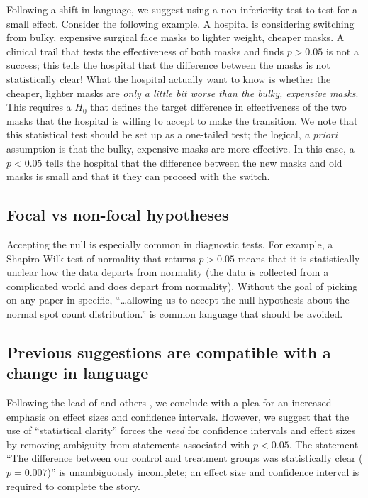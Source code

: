 Following a shift in language, we suggest using a non-inferiority test to test for a small effect. Consider the following example. A hospital is considering switching from bulky, expensive surgical face masks to lighter weight, cheaper masks. A clinical trail that tests the effectiveness of both masks and finds $p > 0.05$ is not a success; this tells the hospital that the difference between the masks is not statistically clear! What the hospital actually want to know is whether the cheaper, lighter masks are \emph{only a little bit worse than the bulky, expensive masks}. This requires a $H_{0}$ that defines the target difference in effectiveness of the two masks that the hospital is willing to accept to make the transition. We note that this statistical test should be set up as a one-tailed test; the logical, \emph{a priori} assumption is that the bulky, expensive masks are more effective. In this case, a $p < 0.05$ tells the hospital that the difference between the new masks and old masks is small and that it they can proceed with the switch.

\subsection*{Focal vs non-focal hypotheses}

Accepting the null is especially common in diagnostic tests. For example, a Shapiro-Wilk test of normality that returns $p > 0.05$ means that it is statistically unclear how the data departs from normality (the data is collected from a complicated world and does depart from normality). Without the goal of picking on any paper in specific, ``\ldots allowing us to accept the null hypothesis about the normal spot count distribution.'' \citep{Karulinetal.2015} is common language that should be avoided.

\subsection*{Previous suggestions are compatible with a change in language}

Following the lead of \citet{Cohen1994} and others \citep{Goodman1999, ZiliakandMcCloskey2008, WassersteinandLazar2016}, we conclude with a plea for an increased emphasis on effect sizes and confidence intervals. However, we suggest that the use of ``statistical clarity'' forces the \emph{need} for confidence intervals and effect sizes by removing ambiguity from statements associated with $p < 0.05$. The statement ``The difference between our control and treatment groups was statistically clear ($p = 0.007$)'' is unambiguously incomplete; an effect size and confidence interval is required to complete the story.

